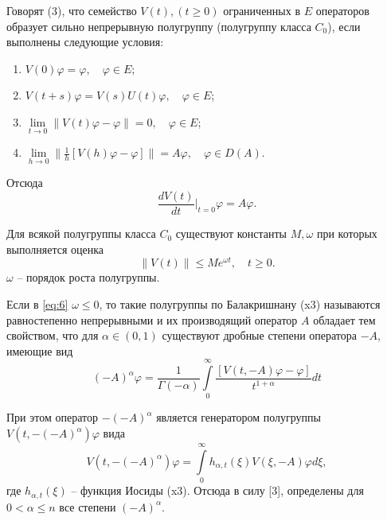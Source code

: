 \documentclass[1244sdpt,a4paper]{article}
\theoremstyle{plain}
\numberwithin{equation}{section}
\begin{document}
Говорят (3), что семейство $V(t), (t \ge 0)$ ограниченных в $E$ операторов образует сильно непрерывную
полугруппу (полугруппу класса $C_0$), если выполнены следующие условия:
\begin{enumerate}
    \item $V(0)\varphi = \varphi, \quad \varphi \in E$;
    \item $V(t+s)\varphi = V(s)U(t)\varphi, \quad \varphi \in E$;
    \item $\lim\limits_{t\to0} \|V(t)\varphi-\varphi\| = 0, \quad \varphi \in E$;
    \item $\lim\limits_{h\to0} \|\frac{1}{h}[V(h)\varphi-\varphi]\| = A\varphi, \quad \varphi \in D(A)$.
\end{enumerate}
Отсюда
\begin{equation}
    \frac{dV(t)}{dt}\bigg|_{t=0} \varphi = A\varphi.
\end{equation}

Для всякой полугруппы класса $C_0$ существуют константы $M, \omega$ при которых выполняется оценка
\begin{equation}
    \label{eq:6}
    \|V(t)\| \le Me^{\omega t}, \quad t \ge 0.
\end{equation}
$\omega$ -- порядок роста полугруппы.


Если в \ref{eq:6} $\omega \le 0$, то такие полугруппы по Балакришнану (x3) называются равностепенно
непрерывными и их производящий оператор $A$ обладает тем свойством, что для $\alpha \in (0, 1)$ существуют
дробные степени оператора $-A$, имеющие вид
\begin{equation}
    (-A)^\alpha \varphi = \frac{1}{\Gamma(-\alpha)}
\int\limits_0^\infty \frac{[V(t, -A)\varphi-\varphi]}{t^{1+\alpha}} dt
\end{equation}

При этом оператор $-(-A)^\alpha$ является генератором полугруппы $V(t, -(-A)^\alpha)\varphi$ вида
\begin{equation}
    V(t, -(-A)^\alpha)\varphi = \int\limits_0^\infty h_{\alpha,t}(\xi) V(\xi, -A) \varphi d\xi,
\end{equation}
где $h_{\alpha,t}(\xi)$ -- функция Иосиды (x3). Отсюда в силу [3], определены для $0 < \alpha \le n$
все степени $(-A)^\alpha$.
\end{document}
